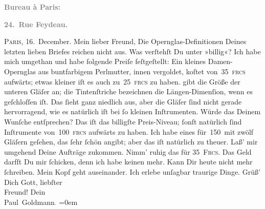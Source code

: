\begin{ledgroupsized}[t]{13cm}
           \pstart
           \begin{otherlanguage}{french}\textcolor{gray}{\textbf{\textbf{Bureau à Paris:}}}\end{otherlanguage}\pend
           \pstart
           \begin{otherlanguage}{french}\textcolor{gray}{\textbf{\textbf{24. Rue Feydeau.}}}\end{otherlanguage}\hfill \textsc{Paris}, 16. December.\pend
           \pstart\center{}Mein lieber Freund,\pend\pstart
           Die Opernglas-Definitionen Deines letzten lieben Briefes reichen nicht aus. Was
               verſtehſt Du unter »billig«? Ich habe mich umgethan\strikeout{,}
               und habe folgende Preiſe feſtgeſtellt: Ein kleines Damen-Opernglas aus buntfarbigem
               Perlmutter, innen vergoldet, koſtet von 35 \textsc{frcs} aufwärts;
               etwas kleiner iſt es auch zu 25 \textsc{frcs} zu haben. \label{K_L02759-1v}\label{K_L02759-1h} gibt die
               Größe der unteren Gläſer an; die {\pb}Tintenſtriche
               bezeichnen die Längen-Dimenſion, wenn es geſchloſſen iſt. Das ſieht ganz niedlich
               aus, aber die Gläſer ſind nicht gerade hervorragend, wie es natürlich iſt bei ſo
               kleinen Inſtrumenten. Würde das Deinem Wunſche entſprechen? Das iſt das billigſte
               Preis-Niveau; ſonſt natürlich ſind Inſtrumente von 100 \textsc{frcs}
               aufwärts zu haben. Ich habe eines für 150 mit zwölf Gläſern geſehen, das ſehr ſchön
               angibt; aber das iſt {\pb}natürlich zu theuer.\pend
           \pstart
           Laß’ mir umgehend Deine Aufträge zukommen. Nimm’ ruhig das für \textsc{35 Frcs}. Das Geld darfſt Du mir ſchicken, denn ich habe keinen \label{K_L02759-2v}\label{K_L02759-2h} mehr.\pend
           \pstart
           Kann Dir heute nicht mehr ſchreiben. Mein Kopf geht auseinander. Ich erlebe unſagbar
               traurige Dinge.\pend
           \pstart
           Grüß’ Dich Gott, liebſter {\\[\baselineskip]}Freund! Dein {\\[\baselineskip]}\spacefill\mbox{Paul Goldmann\textcolor{gray}{.}}\pend
           \leftskip=0em{}\pstart
           \noindent{}\label{T_L02759-1v}\label{T_L02759-1h}\pend
           
         
         \endnumbering{}\end{ledgroupsized}  \newcommand{\dateiname}{L02759}\newcommand{\titel}{Paul Goldmann an Arthur Schnitzler, 16. 12. [1895]}\newcommand{\editorInnen}{Martin Anton Müller und Laura Untner}
      